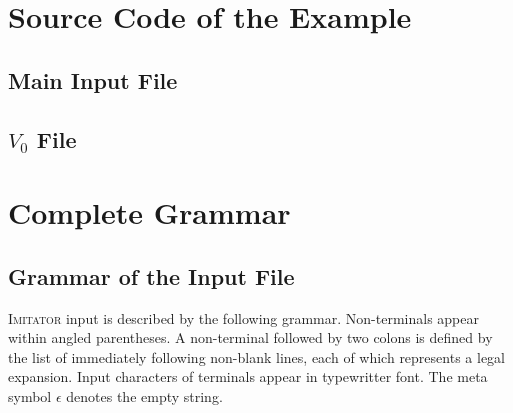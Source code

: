 \documentclass[a4paper,11pt]{article}
\newcommand{\emptystring}{$\epsilon$}
\newcommand{\imitator}{\textsc{Imitator}}
\newcommand{\FichierImitator}[1]{
  \lstset{language=Imitator}
  
}
\begin{document}
\appendix

\section{Source Code of the Example} \label{app:source}

\subsection{Main Input File}

\FichierImitator{include/SRlatch.imi}



\subsection{$V_0$ File}

\FichierImitator{include/SRlatch.v0}



\newpage

\section{Complete Grammar} \label{app:grammar}


\subsection{Grammar of the Input File}

\imitator{} input is described by the following grammar.
Non-terminals appear within angled parentheses.
A non-terminal followed by two colons is defined by the list of immediately following non-blank lines, each of which represents a legal expansion.
Input characters of terminals appear in typewritter font.
The meta symbol \emptystring{} denotes the empty string.
\end{document}
